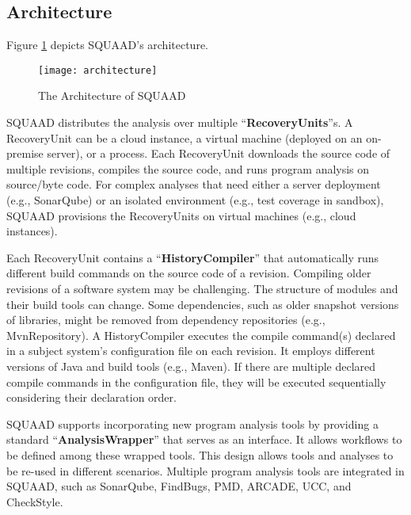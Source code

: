 \subsection{Architecture}
Figure \ref{fig:architecture} depicts SQUAAD's architecture.

\begin{figure}[h]
	\centering
	\texttt{[image: architecture]}
	\caption{The Architecture of SQUAAD}
	\label{fig:architecture}
	\vspace{-0.7cm}
\end{figure}

SQUAAD distributes the analysis over multiple ``\textbf{RecoveryUnits}''s.
A RecoveryUnit can be a cloud instance, a virtual machine (deployed on an on-premise server), or a process.
Each RecoveryUnit downloads the source code of multiple revisions, compiles the source code, and runs program analysis on source/byte code.
For complex analyses that need either a server deployment (e.g., SonarQube) or an isolated environment (e.g., test coverage in sandbox), SQUAAD provisions the RecoveryUnits on virtual machines (e.g., cloud instances).

Each RecoveryUnit contains a ``\textbf{HistoryCompiler}'' that automatically runs different build commands on the source code of a revision.
Compiling older revisions of a software system may be challenging.
The structure of modules and their build tools can change.
Some dependencies, such as older snapshot versions of libraries, might be removed from dependency repositories (e.g., MvnRepository).
A HistoryCompiler executes the compile command(s) declared in a subject system's configuration file on each revision.
It employs different versions of Java and build tools (e.g., Maven).
If there are multiple declared compile commands in the configuration file, they will be executed sequentially considering their declaration order.

SQUAAD supports incorporating new program analysis tools by providing a standard ``\textbf{AnalysisWrapper}'' that serves as an interface.
It allows workflows to be defined among these wrapped tools.
This design allows tools and analyses to be re-used in different scenarios.
Multiple program analysis tools are integrated in SQUAAD, such as SonarQube, FindBugs, PMD, ARCADE, UCC, and CheckStyle.

